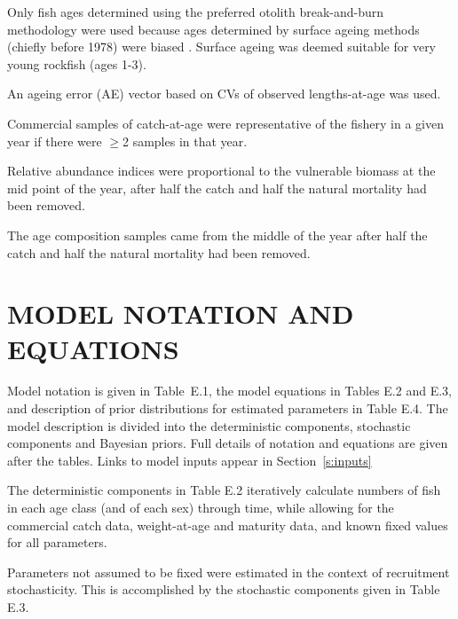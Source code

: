 \documentclass[11pt]{book}
\def\AppLet{E}%
\begin{document}
\begin{enumerate_csas}{}{}
\item Only fish ages determined using the preferred otolith break-and-burn methodology \citep{MacLellan:1997} were used because ages determined by surface ageing methods (chiefly before 1978) were biased \citep{Beamish:1979}. Surface ageing was deemed suitable for very young rockfish (ages 1-3).
\item An ageing error (AE) vector based on CVs of observed lengths-at-age was used.
\item Commercial samples of catch-at-age were representative of the fishery in a given year if there were $\geq$2 samples in that year.
\item Relative abundance indices were proportional to the vulnerable biomass at the mid point of the year, after half the catch and half the natural mortality had been removed.
\item The age composition samples came from the middle of the year after half the catch and half the natural mortality had been removed.
\end{enumerate_csas}

\section{MODEL NOTATION AND EQUATIONS}

Model notation is given in Table~\AppLet.1, the model equations in Tables \AppLet.2 and \AppLet.3, and description of prior distributions for estimated parameters in Table \AppLet.4. 
The model description is divided into the deterministic components, stochastic components and Bayesian priors. 
Full details of notation and equations are given after the tables. %
Links to model inputs appear in Section~\ref{s:inputs}%

The deterministic components in Table \AppLet.2 iteratively calculate numbers of fish in each age class (and of each sex) through time, while allowing for the commercial catch data, weight-at-age and maturity data, and known fixed values for all parameters.

Parameters not assumed to be fixed were estimated in the context of recruitment stochasticity.
This is accomplished by the stochastic components given in Table \AppLet.3. 
\end{document}
